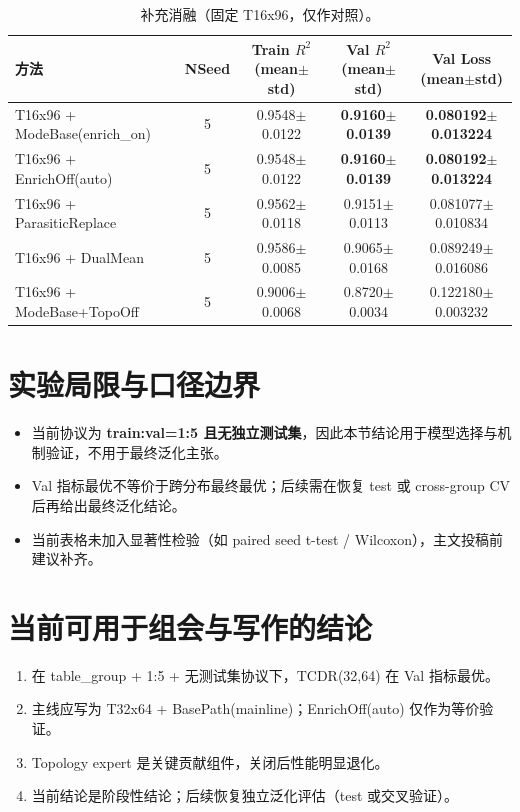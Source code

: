 \documentclass[12pt,a4paper]{ctexart}
\begin{document}
\begin{table}[htbp]
\centering
\footnotesize
\setlength{\tabcolsep}{4pt}
\begin{tabular}{L{4.0cm}c c c c}
\toprule
方法 & NSeed & Train $R^2$ (mean$\pm$std) & Val $R^2$ (mean$\pm$std) & Val Loss (mean$\pm$std) \\
\midrule
T16x96 + ModeBase(enrich\_on) & 5 & 0.9548$\pm$0.0122 & \textbf{0.9160$\pm$0.0139} & \textbf{0.080192$\pm$0.013224} \\
T16x96 + EnrichOff(auto) & 5 & 0.9548$\pm$0.0122 & \textbf{0.9160$\pm$0.0139} & \textbf{0.080192$\pm$0.013224} \\
T16x96 + ParasiticReplace & 5 & 0.9562$\pm$0.0118 & 0.9151$\pm$0.0113 & 0.081077$\pm$0.010834 \\
T16x96 + DualMean & 5 & 0.9586$\pm$0.0085 & 0.9065$\pm$0.0168 & 0.089249$\pm$0.016086 \\
T16x96 + ModeBase+TopoOff & 5 & 0.9006$\pm$0.0068 & 0.8720$\pm$0.0034 & 0.122180$\pm$0.003232 \\
\bottomrule
\end{tabular}
\caption{补充消融（固定 T16x96，仅作对照）。}
\label{tab:t16_ablation_cn}
\end{table}

\section{实验局限与口径边界}
\begin{itemize}
  \item 当前协议为 \textbf{train:val=1:5 且无独立测试集}，因此本节结论用于模型选择与机制验证，不用于最终泛化主张。
  \item Val 指标最优不等价于跨分布最终最优；后续需在恢复 test 或 cross-group CV 后再给出最终泛化结论。
  \item 当前表格未加入显著性检验（如 paired seed t-test / Wilcoxon），主文投稿前建议补齐。
\end{itemize}

\section{当前可用于组会与写作的结论}
\begin{enumerate}
  \item 在 table\_group + 1:5 + 无测试集协议下，TCDR(32,64) 在 Val 指标最优。
  \item 主线应写为 T32x64 + BasePath(mainline)；EnrichOff(auto) 仅作为等价验证。
  \item Topology expert 是关键贡献组件，关闭后性能明显退化。
  \item 当前结论是阶段性结论；后续恢复独立泛化评估（test 或交叉验证）。
\end{enumerate}
\end{document}
